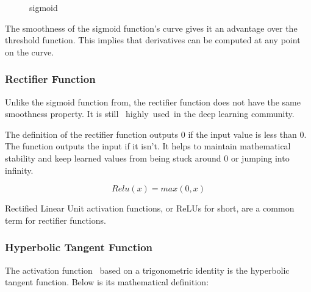 \begin{figure}[htp]
	\centering
{}
\label{sigmoid function}
\caption{sigmoid}
\end{figure}

The smoothness of the sigmoid function's curve gives it an advantage over the threshold function. This implies that derivatives can be computed at any point on the curve.


\subsubsection*{Rectifier  Function}
Unlike the sigmoid function from, the rectifier function does not have the same smoothness property. It is still  highly used in the deep learning community.

The definition of the rectifier function outputs 0 if the input value is less than 0. The function outputs the input if it isn't. It helps to maintain mathematical stability and keep learned values from being stuck around 0 or jumping into infinity.



\begin{equation}
	Relu(x) = max(0, x)
\end{equation}
\begin{figure}[htp]
	\centering
{}
\end{figure}


Rectified Linear Unit activation functions, or ReLUs for short, are a common term for rectifier functions. 


\subsubsection*{Hyperbolic Tangent Function
}
The activation function  based on a trigonometric identity is the hyperbolic tangent function. Below is its mathematical definition:

